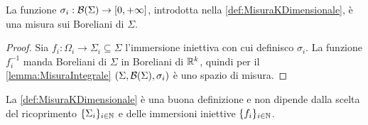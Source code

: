 \begin{remark}\label{nota:SigmaIMisura}
	La funzione $\sigma_i:\mathcal B(\Sigma)\to[0,+\infty]$, introdotta nella \cref{def:MisuraKDimensionale}, è una misura sui Boreliani di $\Sigma$.
\end{remark}
\begin{proof}
	Sia $f_i:\Omega_i\to\Sigma_i\subseteq\Sigma$ l'immersione iniettiva con cui definisco $\sigma_i$. La funzione $f_i^{-1}$ manda Boreliani di $\Sigma$ in Boreliani di $\mathbb R^k$, quindi per il \cref{lemma:MisuraIntegrale} $(\Sigma,\mathcal B(\Sigma),\sigma_i)$ è uno spazio di misura.
\end{proof}

\begin{proposition}\label{prop:DefMisuraKDimBuona}
	La \cref{def:MisuraKDimensionale} è una buona definizione e non dipende dalla scelta del ricoprimento $\{\Sigma_i\}_{i\in\mathbb N}$ e delle immersioni iniettive $\{f_i\}_{i\in\mathbb N}$.
\end{proposition}
